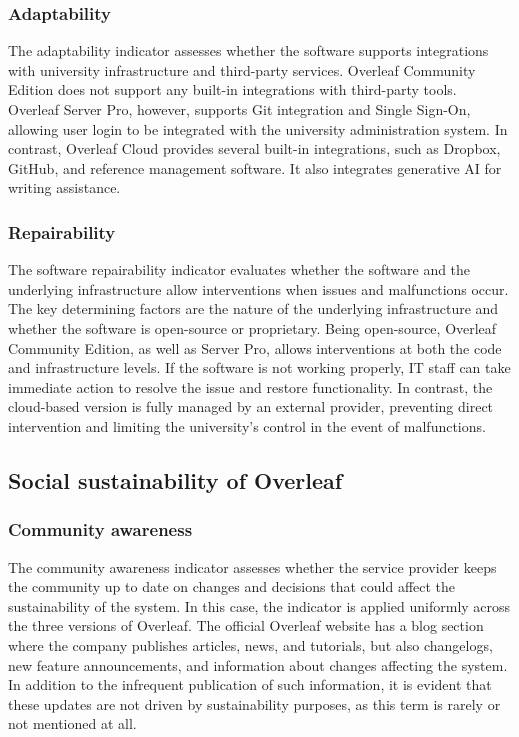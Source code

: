 \subsubsection{Adaptability}
The adaptability indicator assesses whether the software supports integrations with university infrastructure and third-party services. Overleaf Community Edition does not support any built-in integrations with third-party tools. Overleaf Server Pro, however, supports Git integration and Single Sign-On, allowing user login to be integrated with the university administration system. In contrast, Overleaf Cloud provides several built-in integrations, such as Dropbox, GitHub, and reference management software. It also integrates generative AI for writing assistance.  

\subsubsection{Repairability}
The software repairability indicator evaluates whether the software and the underlying infrastructure allow interventions when issues and malfunctions occur. The key determining factors are the nature of the underlying infrastructure and whether the software is open-source or proprietary. Being open-source, Overleaf Community Edition, as well as Server Pro, allows interventions at both the code and infrastructure levels. If the software is not working properly, IT staff can take immediate action to resolve the issue and restore functionality. In contrast, the cloud-based version is fully managed by an external provider, preventing direct intervention and limiting the university's control in the event of malfunctions.

\bigskip

\subsection{Social sustainability of Overleaf}
\label{subsec:overleaf-social}
\medskip

\subsubsection{Community awareness}
The community awareness indicator assesses whether the service provider keeps the community up to date on changes and decisions that could affect the sustainability of the system. In this case, the indicator is applied uniformly across the three versions of Overleaf. The official Overleaf website has a blog section where the company publishes articles, news, and tutorials, but also changelogs, new feature announcements, and information about changes affecting the system. In addition to the infrequent publication of such information, it is evident that these updates are not driven by sustainability purposes, as this term is rarely or not mentioned at all.

